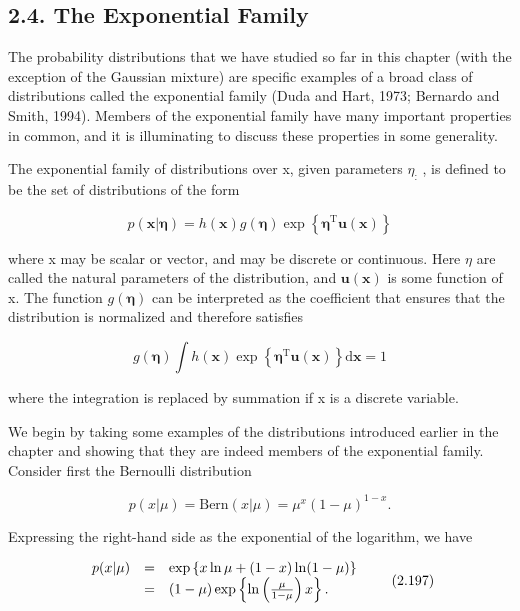 \documentclass[
  10
]{article}
\begin{document}
\subsection{2.4. The Exponential Family}\label{the-exponential-family}

The probability distributions that we have studied so far in this
chapter (with the exception of the Gaussian mixture) are specific
examples of a broad class of distributions called the exponential family
(Duda and Hart, 1973; Bernardo and Smith, 1994). Members of the
exponential family have many important properties in common, and it is
illuminating to discuss these properties in some generality.

The exponential family of distributions over x, given parameters
\(\eta _ { \mathrm { : } }\) , is defined to be the set of distributions
of the form

\[
p (\mathbf {x} | \boldsymbol {\eta}) = h (\mathbf {x}) g (\boldsymbol {\eta}) \exp \left\{\boldsymbol {\eta} ^ {\mathrm{T}} \mathbf {u} (\mathbf {x}) \right\}\tag{2.194}
\]

where x may be scalar or vector, and may be discrete or continuous. Here
\(\eta\) are called the natural parameters of the distribution, and
\(\mathbf { u } ( \mathbf { x } )\) is some function of x. The function
\(g ( \pmb { \eta } )\) can be interpreted as the coefficient that
ensures that the distribution is normalized and therefore satisfies

\[
g (\boldsymbol {\eta}) \int h (\mathbf {x}) \exp \left\{\boldsymbol {\eta} ^ {\mathrm{T}} \mathbf {u} (\mathbf {x}) \right\} \mathrm{d} \mathbf {x} = 1\tag{2.195}
\]

where the integration is replaced by summation if x is a discrete
variable.

We begin by taking some examples of the distributions introduced earlier
in the chapter and showing that they are indeed members of the
exponential family. Consider first the Bernoulli distribution

\[
p (x | \mu) = \mathrm{Bern} (x | \mu) = \mu^ {x} (1 - \mu) ^ {1 - x}.\tag{2.196}
\]

Expressing the right-hand side as the exponential of the logarithm, we
have

\[
\begin{array}{r c l} p (x | \mu) & = & \exp \left\{x \ln \mu + (1 - x) \ln (1 - \mu) \right\} \\ & = & (1 - \mu) \exp \left\{\ln \left(\frac {\mu}{1 - \mu}\right) x \right\}. \end{array}\tag{2.197}
\]
\end{document}
